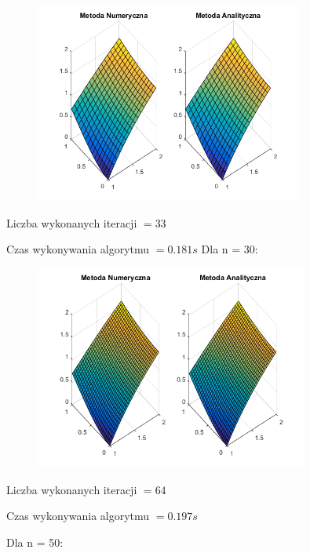 \begin{figure}[!ht]
	\begin{center}
		\includegraphics[width=0.78\textwidth]{Lab6/charts/young/zad1/15.png}
	\end{center}
\end{figure}

Liczba wykonanych iteracji $ = 33 $

Czas wykonywania algorytmu $ = 0.181 s$
\newpage
Dla n = 30:

\begin{figure}[!ht]
	\begin{center}
		\includegraphics[width=0.8\textwidth]{Lab6/charts/young/zad1/30.png}
	\end{center}
\end{figure}

Liczba wykonanych iteracji $ = 64 $

Czas wykonywania algorytmu $ = 0.197 s$

Dla n = 50:

